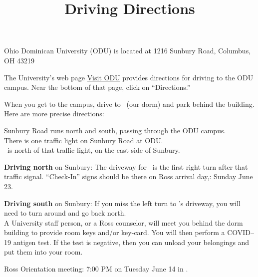 \documentclass{ross}
\title{Driving Directions}
\newcommand{\spa}{\hspace*{1cm}}
\begin{document}
\maketitle

Ohio Dominican University (ODU) is located at 1216 Sunbury Road, Columbus, OH 43219

The University's web page 
\href{https://www.ohiodominican.edu/future-students/admissions-aid/visit-odu/locations}{Visit ODU}  provides directions for driving to the ODU campus.  Near the bottom of that page, click on ``Directions.''   

When you get to the campus, drive to \dormname\ (our dorm) and park behind the building.  \\
Here are more precise directions:

\spa Sunbury Road runs north and south, passing through the ODU campus.\\
\spa There is one traffic light on Sunbury Road at ODU. \\
\spa \dormname\ is north of that traffic light, on the east side of Sunbury.
 
 {\bf Driving north} on Sunbury: The driveway for  \dormname\ is the first right turn after that traffic signal.  ``Check-In'' signs should be there on Ross arrival day,: Sunday June 23.

 {\bf Driving south} on Sunbury: If you miss the left turn to \dormname's driveway,  you will need to turn around and go back north.\\

A University staff person, or a Ross counselor, will meet you behind
the dorm building to provide room keys and/or key-card.  You will then
perform a COVID--19 antigen test.  If the test is negative, then you
can unload your belongings and put them into your room.

Ross Orientation meeting:  7:00 PM on Tuesday June 14 in \orientationlocation.
\end{document}
